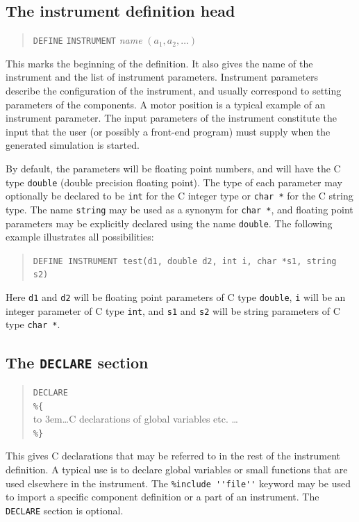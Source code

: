 \subsection{The instrument definition head}

\begin{quote}
  \texttt{DEFINE} \texttt{INSTRUMENT} \textit{name} $(a_1, a_2, \ldots)$
\end{quote} 
This marks the beginning of the definition. It also gives the name of
the instrument and the list of instrument parameters. Instrument
parameters describe the configuration of the instrument, and usually
correspond to setting parameters of the components. A motor position is
a typical example of an instrument parameter. The input parameters of
the instrument constitute the input that the user (or possibly a
front-end program) must supply when the
generated simulation is started. 

By default, the parameters will be floating point numbers, and will have
the C type \verb+double+ (double precision floating point). The type of
each parameter may optionally be declared to be \verb+int+ for the C
integer type or \verb+char *+ for the C string type. The name
\verb+string+ may be used as a synonym for \verb+char *+, and floating
point parameters may be explicitly declared using the name
\verb+double+. The following example illustrates all possibilities:
\begin{quote}
  \texttt{DEFINE INSTRUMENT test(d1, double d2, int i, char *s1, string s2)}
\end{quote}
Here \verb+d1+ and \verb+d2+ will be floating point parameters of C type
\verb+double+, \verb+i+ will be an integer parameter of C type
\verb+int+, and \verb+s1+ and \verb+s2+ will be string parameters of C
type \verb+char *+. 



\subsection{The \texttt{DECLARE} section}
\label{s:declare}

\begin{quote}
  \texttt{DECLARE} \\
  \verb|%{| \\
  \hbox to 3em{}\ldots C declarations of global variables etc. \ldots \\
  \verb|%}|
\end{quote} 
This gives C declarations that may be referred to in the rest of the
instrument definition. A typical use is to declare global variables or
small functions that are used elsewhere in the instrument. The \verb+%include ''file''+ keyword may be used to import a specific
component definition or a part of an instrument. The \texttt{DECLARE} section is optional.


